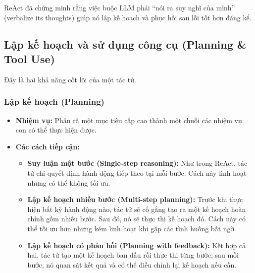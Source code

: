 ReAct đã chứng minh rằng việc buộc LLM phải “nói ra suy nghĩ của mình” (verbalize its thoughts) giúp nó lập kế hoạch và phục hồi sau lỗi tốt hơn đáng kể.

\subsection{Lập kế hoạch và sử dụng công cụ (Planning \& Tool Use)}
\label{ssec:planning_tool_use}
Đây là hai khả năng cốt lõi của một tác tử.

\subsubsection{Lập kế hoạch (Planning)}
\begin{itemize}
    \item \textbf{Nhiệm vụ:} Phân rã một mục tiêu cấp cao thành một chuỗi các nhiệm vụ con có thể thực hiện được.
    \item \textbf{Các cách tiếp cận:}
        \begin{itemize}
            \item \textbf{Suy luận một bước (Single-step reasoning):} Như trong ReAct, tác tử chỉ quyết định hành động tiếp theo tại mỗi bước. Cách này linh hoạt nhưng có thể không tối ưu.
            \item \textbf{Lập kế hoạch nhiều bước (Multi-step planning):} Trước khi thực hiện bất kỳ hành động nào, tác tử sẽ cố gắng tạo ra một kế hoạch hoàn chỉnh gồm nhiều bước. Sau đó, nó sẽ thực thi kế hoạch đó. Cách này có thể tối ưu hơn nhưng kém linh hoạt khi gặp các tình huống bất ngờ.
            \item \textbf{Lập kế hoạch có phản hồi (Planning with feedback):} Kết hợp cả hai. tác tử tạo một kế hoạch ban đầu rồi thực thi từng bước; sau mỗi bước, nó quan sát kết quả và có thể điều chỉnh lại kế hoạch nếu cần.
        \end{itemize}
\end{itemize}

